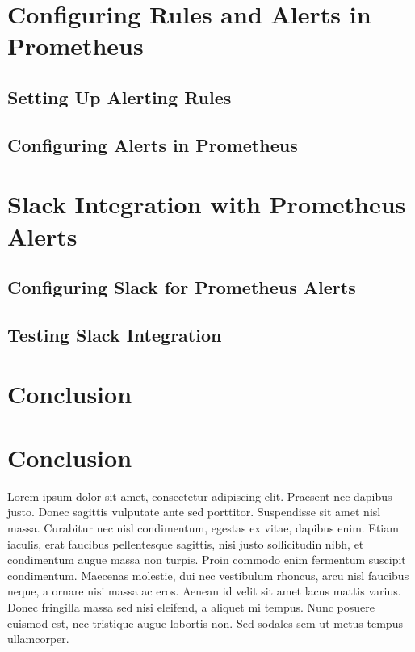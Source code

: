 \section{Configuring Rules and Alerts in Prometheus}
\subsection{Setting Up Alerting Rules}
\subsection{Configuring Alerts in Prometheus}

\section{Slack Integration with Prometheus Alerts}
\subsection{Configuring Slack for Prometheus Alerts}
\subsection{Testing Slack Integration}

\section{Conclusion}







\newpage

\section*{Conclusion}

Lorem ipsum dolor sit amet, consectetur adipiscing elit. Praesent nec dapibus justo. Donec sagittis vulputate ante sed porttitor. Suspendisse sit amet nisl massa. Curabitur nec nisl condimentum, egestas ex vitae, dapibus enim. Etiam iaculis, erat faucibus pellentesque sagittis, nisi justo sollicitudin nibh, et condimentum augue massa non turpis. Proin commodo enim fermentum suscipit condimentum. Maecenas molestie, dui nec vestibulum rhoncus, arcu nisl faucibus neque, a ornare nisi massa ac eros. Aenean id velit sit amet lacus mattis varius. Donec fringilla massa sed nisi eleifend, a aliquet mi tempus. Nunc posuere euismod est, nec tristique augue lobortis non. Sed sodales sem ut metus tempus ullamcorper.

\pagebreak
